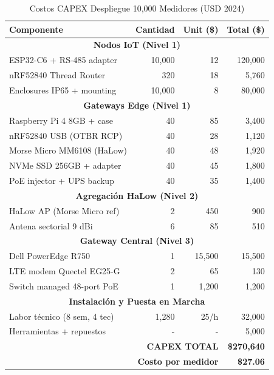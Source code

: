 \begin{table}[h]
\centering
\caption{Costos CAPEX Despliegue 10,000 Medidores (USD 2024)}
\label{tab:capex-10k}
\begin{tabular}{|l|r|r|r|}
\hline
\textbf{Componente} & \textbf{Cantidad} & \textbf{Unit (\$)} & \textbf{Total (\$)} \\
\hline
\multicolumn{4}{|c|}{\textbf{Nodos IoT (Nivel 1)}} \\
\hline
ESP32-C6 + RS-485 adapter & 10,000 & 12 & 120,000 \\
\hline
nRF52840 Thread Router & 320 & 18 & 5,760 \\
\hline
Enclosures IP65 + mounting & 10,000 & 8 & 80,000 \\
\hline
\multicolumn{4}{|c|}{\textbf{Gateways Edge (Nivel 1)}} \\
\hline
Raspberry Pi 4 8GB + case & 40 & 85 & 3,400 \\
\hline
nRF52840 USB (OTBR RCP) & 40 & 28 & 1,120 \\
\hline
Morse Micro MM6108 (HaLow) & 40 & 48 & 1,920 \\
\hline
NVMe SSD 256GB + adapter & 40 & 45 & 1,800 \\
\hline
PoE injector + UPS backup & 40 & 35 & 1,400 \\
\hline
\multicolumn{4}{|c|}{\textbf{Agregación HaLow (Nivel 2)}} \\
\hline
HaLow AP (Morse Micro ref) & 2 & 450 & 900 \\
\hline
Antena sectorial 9 dBi & 6 & 85 & 510 \\
\hline
\multicolumn{4}{|c|}{\textbf{Gateway Central (Nivel 3)}} \\
\hline
Dell PowerEdge R750 & 1 & 15,500 & 15,500 \\
\hline
LTE modem Quectel EG25-G & 2 & 65 & 130 \\
\hline
Switch managed 48-port PoE & 1 & 1,200 & 1,200 \\
\hline
\multicolumn{4}{|c|}{\textbf{Instalación y Puesta en Marcha}} \\
\hline
Labor técnico (8 sem, 4 tec) & 1,280 & 25/h & 32,000 \\
\hline
Herramientas + repuestos & - & - & 5,000 \\
\hline
\hline
\multicolumn{3}{|r|}{\textbf{CAPEX TOTAL}} & \textbf{\$270,640} \\
\hline
\multicolumn{3}{|r|}{\textbf{Costo por medidor}} & \textbf{\$27.06} \\
\hline
\end{tabular}
\end{table}

